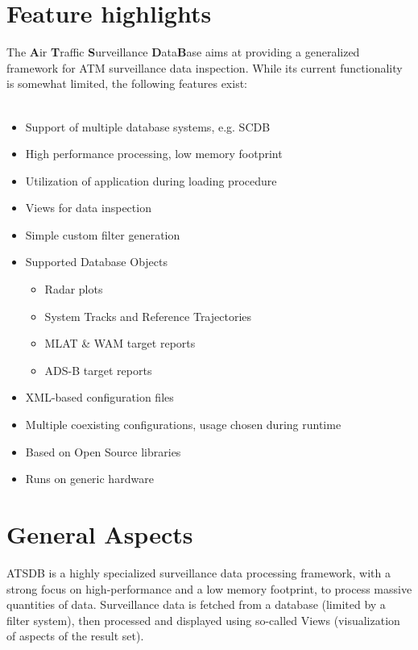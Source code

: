 \documentclass[10pt,letterpaper,extrafontsizes]{memoir}
\begin{document}
\section{Feature highlights}

The \textbf{A}ir \textbf{T}raffic \textbf{S}urveillance \textbf{D}ata\textbf{B}ase aims at providing a generalized framework for ATM surveillance data inspection. While its current functionality is somewhat limited, the following features exist:\\\\

\begin{itemize}  
\item Support of multiple database systems, e.g. SCDB
\item High performance processing, low memory footprint
\item Utilization of application during loading procedure
\item Views for data inspection
\item Simple custom filter generation
\item Supported Database Objects
\begin{itemize}  
\item Radar plots
\item System Tracks and Reference Trajectories
\item MLAT \& WAM target reports
\item ADS-B target reports
\end{itemize}
\item XML-based configuration files
\item Multiple coexisting configurations, usage chosen during runtime
\item Based on Open Source libraries
\item Runs on generic hardware
\end{itemize}

\section{General Aspects}
ATSDB is a highly specialized surveillance data processing framework, with a strong focus on high-performance and  a  low  memory  footprint,  to  process  massive  quantities  of  data.   Surveillance  data  is fetched from a database (limited by a filter system), then processed and displayed using so-called Views (visualization of aspects of the result set).\\\\
\end{document}
